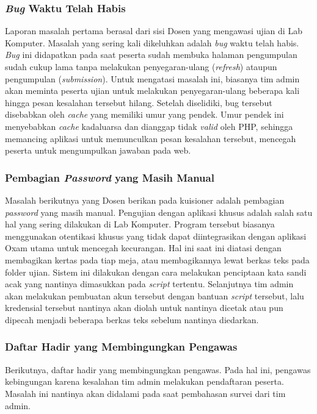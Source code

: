     \subsubsection{\textit{Bug} Waktu Telah
        Habis}\label{ref-prob-dosen-bug-waktu} Laporan masalah pertama berasal
        dari sisi Dosen yang mengawasi ujian di Lab Komputer. Masalah yang
        sering kali dikeluhkan adalah \textit{bug} waktu telah habis.
        \textit{Bug} ini didapatkan pada saat peserta sudah membuka halaman
        pengumpulan sudah cukup lama tanpa melakukan penyegaran-ulang
        (\textit{refresh}) ataupun pengumpulan (\textit{submission}). Untuk
        mengatasi masalah ini, biasanya tim admin akan meminta peserta ujian
        untuk melakukan penyegaran-ulang beberapa kali hingga pesan kesalahan
        tersebut hilang. Setelah diselidiki, bug tersebut disebabkan oleh
        \textit{cache} yang memiliki umur yang pendek. Umur pendek ini
        menyebabkan \textit{cache} kadaluarsa dan dianggap tidak \textit{valid}
        oleh PHP, sehingga memancing aplikasi untuk memunculkan pesan kesalahan
        tersebut, mencegah peserta untuk mengumpulkan jawaban pada web.
    
    \subsubsection{Pembagian \textit{Password} yang Masih
        Manual}\label{ref-prob-dosen-password} Masalah berikutnya yang Dosen
        berikan pada kuisioner adalah pembagian \textit{password} yang masih
        manual. Pengujian dengan aplikasi khusus adalah salah satu hal yang
        sering dilakukan di Lab Komputer. Program tersebut biasanya menggunakan
        otentikasi khusus yang tidak dapat diintegrasikan dengan aplikasi Oxam
        utama untuk mencegah kecurangan. Hal ini saat ini diatasi dengan
        membagikan kertas pada tiap meja, atau membagikannya lewat berkas teks
        pada folder ujian. Sistem ini dilakukan dengan cara melakukan penciptaan
        kata sandi acak yang nantinya dimasukkan pada \textit{script} tertentu.
        Selanjutnya tim admin akan melakukan pembuatan akun tersebut dengan
        bantuan \textit{script} tersebut, lalu kredensial tersebut nantinya akan
        diolah untuk nantinya dicetak atau pun dipecah menjadi beberapa berkas
        teks sebelum nantinya diedarkan.

    \subsubsection{Daftar Hadir yang Membingungkan
        Pengawas}\label{ref-prob-dosen-daftar-hadir} Berikutnya, daftar hadir
        yang membingungkan pengawas. Pada hal ini, pengawas kebingungan karena
        kesalahan tim admin melakukan pendaftaran peserta. Masalah ini nantinya
        akan didalami pada saat pembahasan survei dari tim admin.

